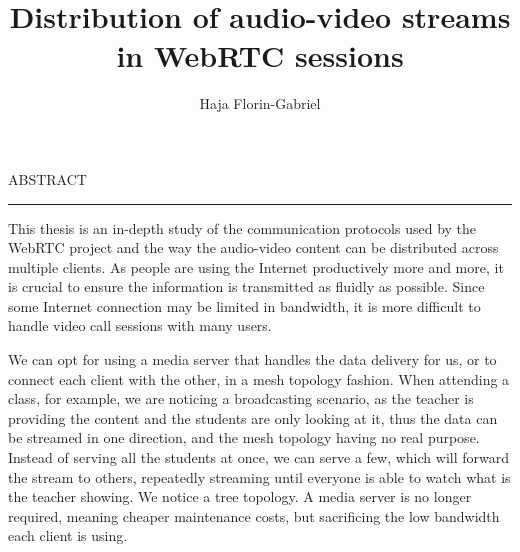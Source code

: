 \documentclass[12pt]{report}
\begin{document}
\title{Distribution of audio-video streams in WebRTC sessions}					   
\author{Haja Florin-Gabriel}											
				
\maketitle


\newpage
\thispagestyle{empty}
\mbox{}


\newpage
{} 

\cleardoublepage
ABSTRACT
\vspace{0.5cm}	
\hrule
\vspace{0.5cm}	

\par This thesis is an in-depth study of the communication protocols used by the WebRTC project and the way the audio-video content can be distributed across multiple clients. As people are using the Internet productively more and more, it is crucial to ensure the information is transmitted as fluidly as possible. Since some Internet connection may be limited in bandwidth, it is more difficult to handle video call sessions with many users. 
\par We can opt for using a media server that handles the data delivery for us, or to connect each client with the other, in a mesh topology fashion. When attending a class, for example, we are noticing a broadcasting scenario, as the teacher is providing the content and the students are only looking at it, thus the data can be streamed in one direction, and the mesh topology having no real purpose. Instead of serving all the students at once, we can serve a few, which will forward the stream to others, repeatedly streaming until everyone is able to watch what is the teacher showing. We notice a tree topology. A media server is no longer required, meaning cheaper maintenance costs, but sacrificing the low bandwidth each client is using.


\tableofcontents


\newpage
{}




%
%

%


\end{document}
